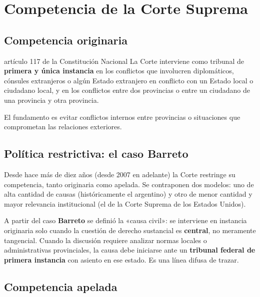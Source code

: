 \documentclass[12pt,oneside]{book}
\begin{document}
\section{Competencia de la Corte Suprema}

\subsection{Competencia originaria}

\begin{norma}{artículo 117 de la Constitución Nacional}
La Corte interviene como tribunal de \textbf{primera y única instancia} en los conflictos que involucren diplomáticos, cónsules extranjeros o algún Estado extranjero en conflicto con un Estado local o ciudadano local, y en los conflictos entre dos provincias o entre un ciudadano de una provincia y otra provincia.
\end{norma}

El fundamento es evitar conflictos internos entre provincias o situaciones que comprometan las relaciones exteriores.

\subsection{Política restrictiva: el caso Barreto}

Desde hace más de diez años (desde 2007 en adelante) la Corte restringe su competencia, tanto originaria como apelada. Se contraponen dos modelos: uno de alta cantidad de causas (históricamente el argentino) y otro de menor cantidad y mayor relevancia institucional (el de la Corte Suprema de los Estados Unidos).

A partir del caso \textbf{Barreto} se definió la «causa civil»: se interviene en instancia originaria solo cuando la cuestión de derecho sustancial es \textbf{central}, no meramente tangencial. Cuando la discusión requiere analizar normas locales o administrativas provinciales, la causa debe iniciarse ante un \textbf{tribunal federal de primera instancia} con asiento en ese estado. Es una línea difusa de trazar.

\subsection{Competencia apelada}
\end{document}
